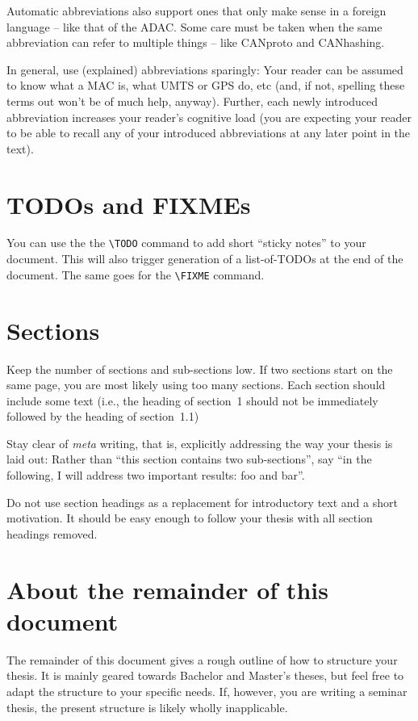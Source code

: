 Automatic abbreviations also support ones that only make sense in a foreign language -- like that of the \ac{ADAC}.
Some care must be taken when the same abbreviation can refer to multiple things -- like \ac{CANproto} and \ac{CANhashing}.

In general, use (explained) abbreviations sparingly:
Your reader can be assumed to know what a MAC is, what UMTS or GPS do, etc (and, if not, spelling these terms out won't be of much help, anyway).
Further, each newly introduced abbreviation increases your reader's cognitive load (you are expecting your reader to be able to recall any of your introduced abbreviations at any later point in the text).


\section{TODOs and FIXMEs}

You can use the the \verb|\TODO| command to add short \enquote{sticky notes} to your document.
This will also trigger generation of a list-of-TODOs at the end of the document.
The same goes for the \verb|\FIXME| command.


\section{Sections}

Keep the number of sections and sub-sections low.
If two sections start on the same page, you are most likely using too many sections.
Each section should include some text (i.e., the heading of section~1 should not be immediately followed by the heading of section~1.1)

Stay clear of \emph{meta} writing, that is, explicitly addressing the way your thesis is laid out:
Rather than \enquote{this section contains two sub-sections}, say \enquote{in the following, I will address two important results: foo and bar}.

Do not use section headings as a replacement for introductory text and a short motivation.
It should be easy enough to follow your thesis with all section headings removed.


\section{About the remainder of this document}

The remainder of this document gives a rough outline of how to structure your thesis.
It is mainly geared towards Bachelor and Master's theses, but feel free to adapt the structure to your specific needs.
If, however, you are writing a seminar thesis, the present structure is likely wholly inapplicable.


